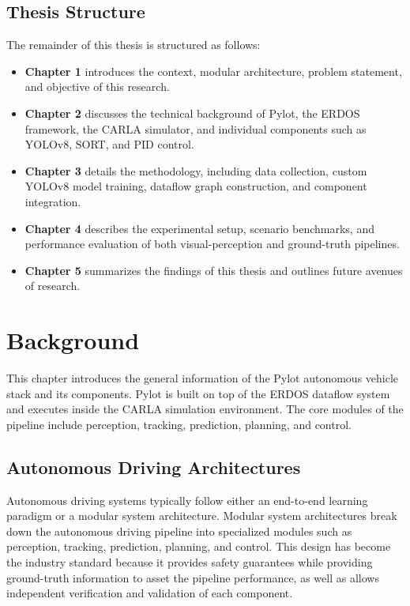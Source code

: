 \documentclass[11pt,a4paper]{report}
\begin{document}
\section{Thesis Structure}
\label{sec: structure}
The remainder of this thesis is structured as follows:
\begin{itemize}
    \item \textbf{Chapter 1} introduces the context, modular architecture, problem statement, and objective of this research.
    \item \textbf{Chapter 2} discusses the technical background of Pylot, the ERDOS framework, the CARLA simulator, and individual components such as YOLOv8, SORT, and PID control.
    \item \textbf{Chapter 3} details the methodology, including data collection, custom YOLOv8 model training, dataflow graph construction, and component integration.
    \item \textbf{Chapter 4} describes the experimental setup, scenario benchmarks, and performance evaluation of both visual-perception and ground-truth pipelines.
    \item \textbf{Chapter 5} summarizes the findings of this thesis and outlines future avenues of research.
\end{itemize}



\chapter{Background}

This chapter introduces the general information of the Pylot autonomous vehicle stack and its components. Pylot is built on top of the ERDOS dataflow system and executes inside the CARLA simulation environment. The core modules of the pipeline include perception, tracking, prediction, planning, and control.


\section{Autonomous Driving Architectures}
\label{sec:architectures}
Autonomous driving systems typically follow either an end-to-end learning paradigm or a modular system architecture. 
Modular system architectures break down the autonomous driving pipeline into specialized modules such as perception, tracking, prediction, planning, and control. This design has become the industry standard because it provides safety guarantees while providing ground-truth information to asset the pipeline performance, as well as allows independent verification and validation of each component. 
\end{document}
